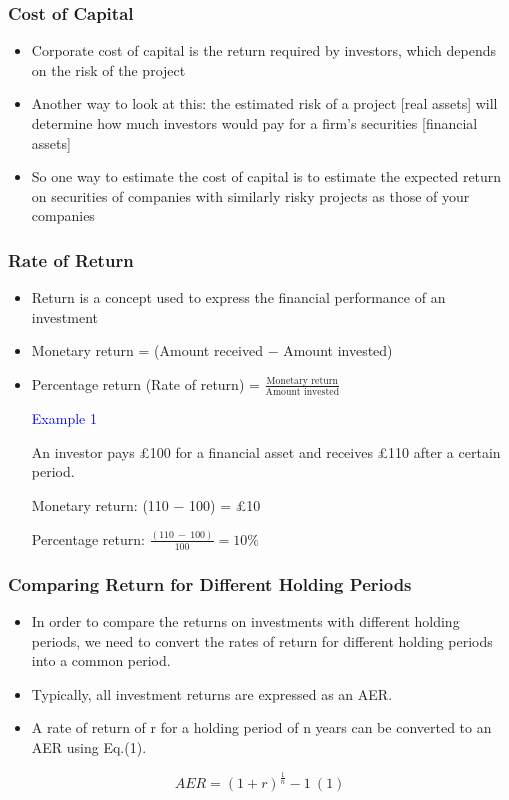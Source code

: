 \documentclass[9pt,aspectratio=169]{beamer}
\begin{document}
\begin{frame}
\frametitle{\textnormal{Cost of Capital}}

\begin{itemize}

\item Corporate cost of capital is the return required by investors, which depends on the risk of the project

\item Another way to look at this: the estimated risk of a project [real assets] will determine how much investors would pay for a firm's securities [financial assets]

\item So one way to estimate the cost of capital is to estimate the expected return on securities of companies with similarly risky projects as those of your companies

\end{itemize}

\end{frame}

\begin{frame}
\frametitle{\textnormal{Rate of Return}}

\begin{itemize}
\item Return is a concept used to express the financial performance of an investment
\item Monetary return = (Amount received $-$ Amount invested)
\item Percentage return (Rate of return) = $ \frac{ \text{Monetary return}}{\text{Amount invested}}$


\vspace{6pt}
\textcolor{blue}{Example 1}

\vspace{6pt}
An investor pays £100 for a financial asset and receives £110 after a certain period.

Monetary return:		(110 $-$ 100) = £10

Percentage return:	$\frac{(110 \ - \ 100)}{100} = 10\%$

\end{itemize}

\end{frame}

\begin{frame}
\frametitle{\textnormal{Comparing Return for Different Holding Periods}}

\begin{itemize}
    \item In order to compare the returns on investments with different holding periods, we need to convert the rates of return for different holding periods into a common period.
\item Typically, all investment returns are expressed as an AER.
\item A rate of return of r for a holding period of n years can be converted to an AER using Eq.(1).

\end{itemize}
$$
    AER=(1+r)^{\frac{1}{n}}-1   \ (1)
    $$

\end{frame}
\end{document}
